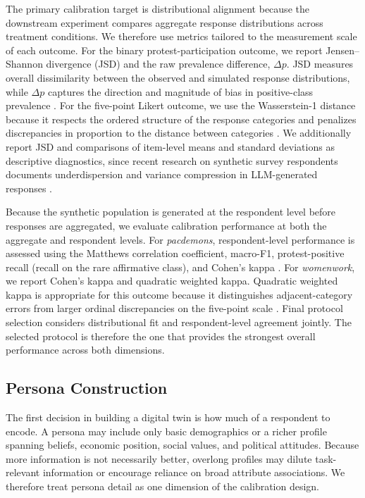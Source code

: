 The primary calibration target is distributional alignment because the
downstream experiment compares aggregate response distributions across
treatment conditions. We therefore use metrics tailored to the measurement
scale of each outcome. For the binary protest-participation outcome, we
report Jensen--Shannon divergence (JSD) and the raw prevalence difference,
$\Delta p$. JSD measures overall dissimilarity between the observed and
simulated response distributions, while $\Delta p$ captures the direction
and magnitude of bias in positive-class prevalence
\citep{lin1991,bisbee2024}. For the five-point Likert outcome, we use the
Wasserstein-1 distance because it respects the ordered structure of the
response categories and penalizes discrepancies in proportion to the
distance between categories \citep{rubner2000}. We additionally report JSD
and comparisons of item-level means and standard deviations as descriptive
diagnostics, since recent research on synthetic survey respondents
documents underdispersion and variance compression in LLM-generated
responses \citep{bisbee2024,toubia2025}.

Because the synthetic population is generated at the respondent level
before responses are aggregated, we evaluate calibration performance at
both the aggregate and respondent levels. For \textit{pacdemons},
respondent-level performance is assessed using the Matthews correlation
coefficient, macro-F1, protest-positive recall (recall on the rare
affirmative class), and Cohen's kappa
\citep{cohen1960,matthews1975,powers2011}. For \textit{womenwork}, we
report Cohen's kappa and quadratic weighted kappa. Quadratic weighted kappa
is appropriate for this outcome because it distinguishes adjacent-category
errors from larger ordinal discrepancies on the five-point scale
\citep{cohen1968}. Final protocol selection considers distributional fit
and respondent-level agreement jointly. The selected protocol is therefore
the one that provides the strongest overall performance across both
dimensions.

\subsection{Persona Construction}
\label{sec:persona-construction}

The first decision in building a digital twin is how much of a respondent
to encode. A persona may include only basic demographics or a richer
profile spanning beliefs, economic position, social values, and political
attitudes. Because more information is not necessarily better, overlong
profiles may dilute task-relevant information or encourage reliance on
broad attribute associations. We therefore treat persona detail as one
dimension of the calibration design.

